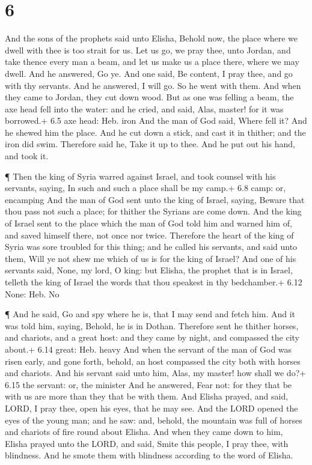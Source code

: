 \hypertarget{section-5}{%
\section{6}\label{section-5}}

 And the sons of the prophets said unto Elisha, Behold now,
the place where we dwell with thee is too strait for us. 
Let us go, we pray thee, unto Jordan, and take thence every man a beam,
and let us make us a place there, where we may dwell. And he answered,
Go ye.  And one said, Be content, I pray thee, and go with
thy servants. And he answered, I will go.  So he went with
them. And when they came to Jordan, they cut down wood.  But
as one was felling a beam, the axe head fell into the water: and he
cried, and said, Alas, master! for it was borrowed.+ 6.5 axe head: Heb.
iron  And the man of God said, Where fell it? And he shewed
him the place. And he cut down a stick, and cast it in thither; and the
iron did swim.  Therefore said he, Take it up to thee. And
he put out his hand, and took it.

 ¶ Then the king of Syria warred against Israel, and took
counsel with his servants, saying, In such and such a place shall be my
camp.+ 6.8 camp: or, encamping  And the man of God sent unto
the king of Israel, saying, Beware that thou pass not such a place; for
thither the Syrians are come down.  And the king of Israel
sent to the place which the man of God told him and warned him of, and
saved himself there, not once nor twice.  Therefore the
heart of the king of Syria was sore troubled for this thing; and he
called his servants, and said unto them, Will ye not shew me which of us
is for the king of Israel?  And one of his servants said,
None, my lord, O king: but Elisha, the prophet that is in Israel,
telleth the king of Israel the words that thou speakest in thy
bedchamber.+ 6.12 None: Heb. No

 ¶ And he said, Go and spy where he is, that I may send and
fetch him. And it was told him, saying, Behold, he is in Dothan.
 Therefore sent he thither horses, and chariots, and a
great host: and they came by night, and compassed the city about.+ 6.14
great: Heb. heavy  And when the servant of the man of God
was risen early, and gone forth, behold, an host compassed the city both
with horses and chariots. And his servant said unto him, Alas, my
master! how shall we do?+ 6.15 the servant: or, the minister
 And he answered, Fear not: for they that be with us are
more than they that be with them.  And Elisha prayed, and
said, LORD, I pray thee, open his eyes, that he may see. And the LORD
opened the eyes of the young man; and he saw: and, behold, the mountain
was full of horses and chariots of fire round about Elisha.
 And when they came down to him, Elisha prayed unto the
LORD, and said, Smite this people, I pray thee, with blindness. And he
smote them with blindness according to the word of Elisha.

